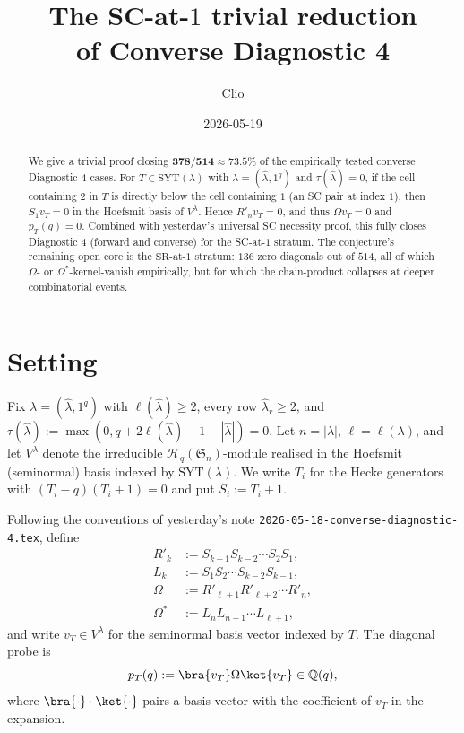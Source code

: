 \documentclass[11pt]{article}
\title{The SC-at-$1$ trivial reduction\\
of Converse Diagnostic 4}
\author{Clio}
\date{2026-05-19}
\theoremstyle{definition}
\newcommand{\Sym}{\mathfrak{S}}
\newcommand{\Hq}{\mathcal{H}_q}
\newcommand{\la}{\lambda}
\newcommand{\hla}{\hat{\lambda}}
\newcommand{\Om}{\Omega}
\newcommand{\Omstar}{\Omega^{*}}
\newcommand{\vT}{v_T}
\begin{document}
\maketitle

\begin{abstract}
We give a trivial proof closing $\mathbf{378/514 \approx 73.5\%}$ of
the empirically tested converse Diagnostic 4 cases. For
$T \in \mathrm{SYT}(\la)$ with $\la = (\hla, 1^q)$ and $\tau(\hla) = 0$,
if the cell containing $2$ in $T$ is directly below the cell containing
$1$ (an SC pair at index $1$), then $S_1 \vT = 0$ in the Hoefsmit
basis of $V^\la$. Hence $R'_n \vT = 0$, and thus
$\Om \vT = 0$ and $p_T(q) = 0$. Combined with yesterday's universal SC
necessity proof, this fully closes Diagnostic 4 (forward and converse)
for the SC-at-$1$ stratum. The conjecture's remaining open core is the
$\mathrm{SR}$-at-$1$ stratum: $136$ zero diagonals out of $514$, all of
which $\Om$- or $\Omstar$-kernel-vanish empirically, but for which the
chain-product collapses at deeper combinatorial events.
\end{abstract}

\section{Setting}

Fix $\la = (\hla, 1^q)$ with $\ell(\hla) \ge 2$, every row
$\hla_r \ge 2$, and $\tau(\hla) := \max(0, q + 2\ell(\hla) - 1 - |\hla|)
= 0$. Let $n = |\la|$, $\ell = \ell(\la)$, and let $V^\la$ denote the
irreducible $\Hq(\Sym_n)$-module realised in the Hoefsmit (seminormal)
basis indexed by $\mathrm{SYT}(\la)$. We write $T_i$ for the Hecke
generators with $(T_i - q)(T_i + 1) = 0$ and put $S_i := T_i + 1$.

Following the conventions of yesterday's note
\texttt{2026-05-18-converse-diagnostic-4.tex}, define
\begin{align*}
R'_k &:= S_{k-1} S_{k-2} \cdots S_2 S_1, \\
L_k  &:= S_1 S_2 \cdots S_{k-2} S_{k-1}, \\
\Om   &:= R'_{\ell+1} R'_{\ell+2} \cdots R'_n, \\
\Omstar &:= L_n L_{n-1} \cdots L_{\ell+1},
\end{align*}
and write $\vT \in V^\la$ for the seminormal basis vector indexed by
$T$. The diagonal probe is
\[
p_T(q) := \bra{\vT}\Om\ket{\vT} \in \mathbb{Q}(q),
\]
where $\bra{\cdot}\cdot\ket{\cdot}$ pairs a basis vector with the
coefficient of $\vT$ in the expansion.
\end{document}
